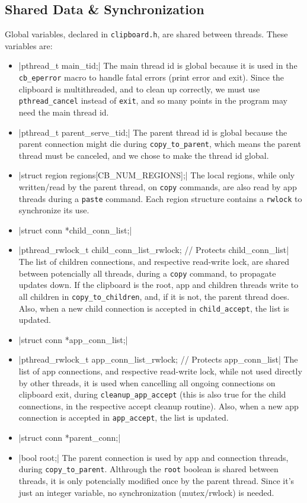 \documentclass[a4paper, titlepage, english]{article}
\begin{document}
	\subsection{Shared Data \& Synchronization}
	\par
	Global variables, declared in \texttt{clipboard.h}, are shared between threads. These variables are:
	\begin{itemize}
		\item {}|pthread_t main_tid;|
		The main thread id is global because it is used in the \texttt{cb\_eperror} macro to handle fatal errors (print error and exit). Since the clipboard is multithreaded, and to clean up correctly, we must use \texttt{pthread\_cancel} instead of \texttt{exit}, and so many points in the program may need the main thread id.
		\item {}|pthread_t parent_serve_tid;|
		The parent thread id is global because the parent connection might die during \texttt{copy\_to\_parent}, which means the parent thread must be canceled, and we chose to make the thread id global.
		\item {}|struct region regions[CB_NUM_REGIONS];|
		The local regions, while only written/read by the parent thread, on \texttt{copy} commands, are also read by app threads during a \texttt{paste} command. Each region structure contains a \texttt{rwlock} to synchronize its use.
		\item {}|struct conn *child_conn_list;|
		\item {}|pthread_rwlock_t child_conn_list_rwlock; // Protects child_conn_list|
		The list of children connections, and respective read-write lock, are shared between potencially all threads, during a \texttt{copy} command, to propagate updates down. If the clipboard is the root, app and children threads write to all children in \texttt{copy\_to\_children}, and, if it is not, the parent thread does. Also, when a new child connection is accepted in \texttt{child\_accept}, the list is updated.
		\item {}|struct conn *app_conn_list;|
		\item {}|pthread_rwlock_t app_conn_list_rwlock; // Protects app_conn_list|
		The list of app connections, and respective read-write lock, while not used directly by other threads, it is used when cancelling all ongoing connections on clipboard exit, during \texttt{cleanup\_app\_accept} (this is also true for the child connections, in the respective accept cleanup routine). Also, when a new app connection is accepted in \texttt{app\_accept}, the list is updated.
		\item {}|struct conn *parent_conn;|
		\item {}|bool root;|
		The parent connection is used by app and connection threads, during \texttt{copy\_to\_parent}. Althrough the \texttt{root} boolean is shared between threads, it is only potencially modified once by the parent thread. Since it's just an integer variable, no synchronization (mutex/rwlock) is needed.
	\end{itemize}
\end{document}
